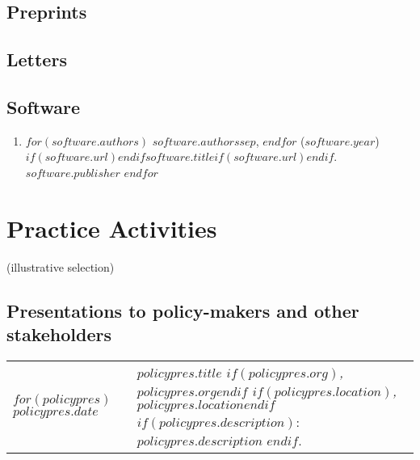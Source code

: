 \documentclass[martgin, line]{article}
\begin{document}
\subsection*{Preprints}

\begin{enumerate}
  
\end{enumerate}


\subsection*{Letters}

\begin{enumerate}
  
\end{enumerate}


\subsection*{Software}

\begin{enumerate}
  $for(software)$
  \item
  $for(software.authors)$
  $software.authors$$sep$,
  $endfor$
  ($software.year$)
  $if(software.url)$\href{$software.url$}{$endif$$software.title$$if(software.url)$}$endif$.
  $software.publisher$
  $endfor$
\end{enumerate}

\section*{Practice Activities}

(illustrative selection)

\subsection*{Presentations to policy-makers and other stakeholders}


\setlength{\extrarowheight}{.75em}
\begin{longtable}[l]{lp{5in}}   
$for(policypres)$
$policypres.date$&
\parbox[t]{5in}{
    \textit{$policypres.title$%
    $if(policypres.org)$, $policypres.org$$endif$%
    $if(policypres.location)$, $policypres.location$$endif$}%
    $if(policypres.description)$: %
    $policypres.description$%
    $endif$.%
  }\\
$endfor$
\end{longtable}
\setlength{\extrarowheight}{0em}
\end{document}
